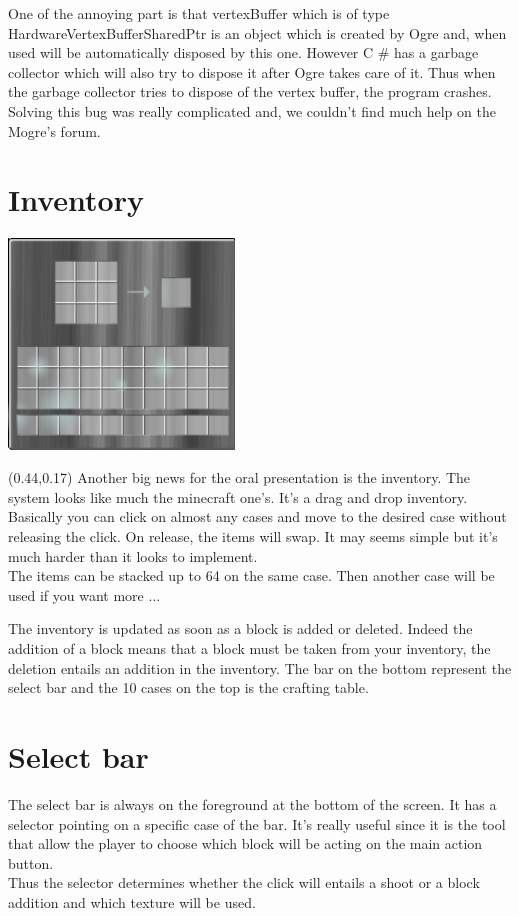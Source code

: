 \documentclass[article]{report}         %
\begin{document}
            One of the annoying part is that vertexBuffer which is of type HardwareVertexBufferSharedPtr is an object which is created by Ogre and, when used will be automatically disposed by this one. However C \# has a garbage collector which will also try to dispose it after Ogre takes care of it. Thus when the garbage collector tries to dispose of the vertex buffer, the program crashes.\\


            Solving this bug was really complicated and, we couldn't find much help on the Mogre's forum.
\newpage

      \section{Inventory}
	 \includegraphics[width=6cm]{images/Inventory.png}

	 \begin{textblock}{0.45}(0.44,0.17)
    		Another big news for the oral presentation is the inventory. The system looks like much the minecraft one's. It's a drag and drop inventory.\\
Basically you can click on almost any cases and move to the desired case without releasing the click. On release, the items will swap. It may seems simple but it's much harder than it looks to implement.\\
The items can be stacked up to 64 on the same case. Then another case will be used if you want more ... 
         \end{textblock}
\bigskip\bigskip
The inventory is updated as soon as a block is added or deleted. Indeed the addition of a block means that a block must be taken from your inventory, the deletion entails an addition in the inventory. The bar on the bottom represent the select bar and the 10 cases on the top is the crafting table.

\section{Select bar}
	The select bar is always on the foreground at the bottom of the screen. It has a selector pointing on a specific case of the bar. It's really useful since it is the tool that allow the player to choose which block will be acting on the main action button.\\
Thus the selector determines whether the click will entails a shoot or a block addition and which texture will be used.\\
\end{document}
